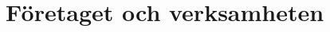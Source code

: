 \documentclass[../report.tex]{subfiles}
\begin{document}
    \chapter{Företaget och verksamheten}
    
\end{document}
